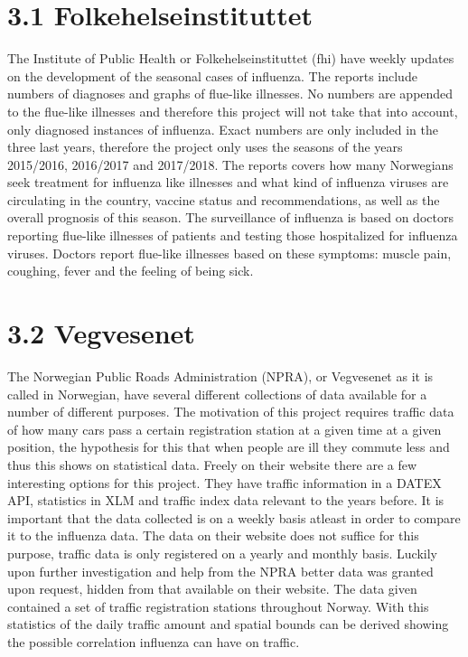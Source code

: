 \documentclass[11pt]{report}
\begin{document}
\section*{3.1 Folkehelseinstituttet}
The Institute of Public Health or Folkehelseinstituttet (fhi) have weekly updates\cite{fhi} on the development of the seasonal cases of influenza. The reports include numbers of diagnoses and graphs of flue-like illnesses. No numbers are appended to the flue-like illnesses and therefore this project will not take that into account, only diagnosed instances of influenza. Exact numbers are only included in the three last years, therefore the project only uses the seasons of the years 2015/2016, 2016/2017 and 2017/2018. The reports covers how many Norwegians seek treatment for influenza like illnesses and what kind of influenza viruses are circulating in the country, vaccine status and recommendations, as well as the overall prognosis of this season. The surveillance of influenza is based on doctors reporting flue-like illnesses of patients and testing those hospitalized for influenza viruses. Doctors report flue-like illnesses based on these symptoms: muscle pain, coughing, fever and the feeling of being sick.

\section*{3.2 Vegvesenet}
The Norwegian Public Roads Administration (NPRA), or Vegvesenet as it is called in Norwegian, have several different collections of data available for a number of different purposes. The motivation of this project requires traffic data of how many cars pass a certain registration station at a given time at a given position, the hypothesis for this that when people are ill they commute less and thus this shows on statistical data. Freely on their website \cite{vegvesenet} there are a few interesting options for this project. They have traffic information in a DATEX API, statistics in XLM and traffic index data relevant to the years before. It is important that the data collected is on a weekly basis atleast in order to compare it to the influenza data. The data on their website does not suffice for this purpose, traffic data is only registered on a yearly and monthly basis. Luckily upon further investigation and help from the NPRA better data was granted upon request, hidden from that available on their website. The data given contained a set of traffic registration stations throughout Norway. With this statistics of the daily traffic amount and spatial bounds can be derived showing the possible correlation influenza can have on traffic.
\end{document}
